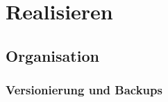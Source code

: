 \chapter{Realisieren} \label{ch:implement}

\section{Organisation}

\subsection{Versionierung und Backups}
